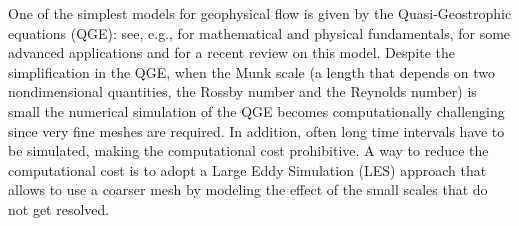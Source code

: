 \documentclass[11pt,a4paper]{article}
\begin{document}

One of the simplest models for geophysical flow is given by the Quasi-Geostrophic equations (QGE): see, e.g., \cite{Vallis2006, Cushman-Roisin2011, McWilliams2006} for mathematical and physical fundamentals, \cite{San2012, Carere2021, Strazzullo2017} for some advanced applications and \cite{QGE_review} for a recent review on this model. 
Despite the simplification in the QGE, 
when the Munk scale (a length that depends on two nondimensional quantities, the Rossby number and the
Reynolds number) is small the numerical simulation of the QGE 
becomes computationally challenging since very fine meshes are required.
In addition, often long time intervals have to be simulated, making the computational cost prohibitive. 
A way to reduce the computational cost is to adopt a Large Eddy Simulation (LES) approach that 
allows to use a coarser mesh by modeling the effect of the small scales that do not get resolved. 
\end{document}
